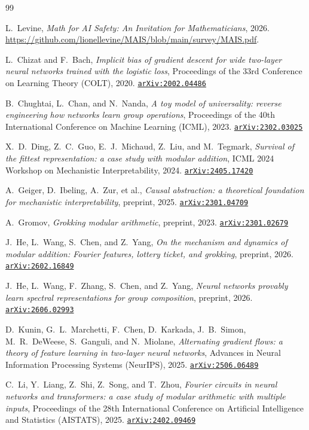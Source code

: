 \documentclass[11pt]{amsart}
\newcommand{\arxiv}[1]{\href{https://arxiv.org/abs/#1}{\texttt{arXiv:#1}}}
\theoremstyle{plain}
\theoremstyle{definition}
\begin{document}
\begin{thebibliography}{99}

L.~Levine,
\emph{Math for AI Safety: An Invitation for Mathematicians},
2026. \url{https://github.com/lionellevine/MAIS/blob/main/survey/MAIS.pdf}.


L.~Chizat and F.~Bach,
\emph{Implicit bias of gradient descent for wide two-layer neural networks trained with the logistic loss},
Proceedings of the 33rd Conference on Learning Theory (COLT), 2020.
\arxiv{2002.04486}

B.~Chughtai, L.~Chan, and N.~Nanda,
\emph{A toy model of universality: reverse engineering how networks learn group operations},
Proceedings of the 40th International Conference on Machine Learning (ICML), 2023.
\arxiv{2302.03025}

X.~D.~Ding, Z.~C.~Guo, E.~J.~Michaud, Z.~Liu, and M.~Tegmark,
\emph{Survival of the fittest representation: a case study with modular addition},
ICML 2024 Workshop on Mechanistic Interpretability, 2024.
\arxiv{2405.17420}

A.~Geiger, D.~Ibeling, A.~Zur, et al.,
\emph{Causal abstraction: a theoretical foundation for mechanistic interpretability},
preprint, 2025.
\arxiv{2301.04709}

A.~Gromov,
\emph{Grokking modular arithmetic},
preprint, 2023.
\arxiv{2301.02679}

J.~He, L.~Wang, S.~Chen, and Z.~Yang,
\emph{On the mechanism and dynamics of modular addition: Fourier features, lottery ticket, and grokking},
preprint, 2026.
\arxiv{2602.16849}

J.~He, L.~Wang, F.~Zhang, S.~Chen, and Z.~Yang,
\emph{Neural networks provably learn spectral representations for group composition},
preprint, 2026.
\arxiv{2606.02993}

D.~Kunin, G.~L.~Marchetti, F.~Chen, D.~Karkada, J.~B.~Simon, M.~R.~DeWeese, S.~Ganguli, and N.~Miolane,
\emph{Alternating gradient flows: a theory of feature learning in two-layer neural networks},
Advances in Neural Information Processing Systems (NeurIPS), 2025.
\arxiv{2506.06489}

C.~Li, Y.~Liang, Z.~Shi, Z.~Song, and T.~Zhou,
\emph{Fourier circuits in neural networks and transformers: a case study of modular arithmetic with multiple inputs},
Proceedings of the 28th International Conference on Artificial Intelligence and Statistics (AISTATS), 2025.
\arxiv{2402.09469}


\end{thebibliography}
\end{document}

